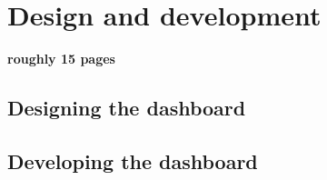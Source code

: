 \chapter{Design and development}
\textbf{roughly 15 pages}
\section{Designing the dashboard}

\section{Developing the dashboard}